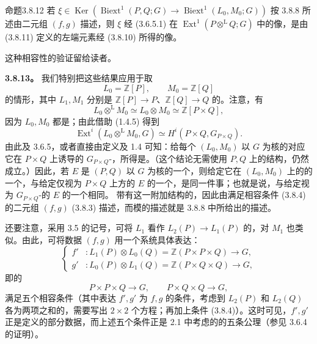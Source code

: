 \begin{SGAresult}{命题}{3.8.12}
若 $\xi\in\operatorname{Ker}(\operatorname{Biext}^1(P,Q;G)\to\operatorname{Biext}^1(L_0,M_0;G))$ 按 3.8.8 所述由二元组 $(f,g)$ 描述，则 $\xi$ 经 (3.6.5.1) 在 $\operatorname{Ext}^1(P\mathbin{\otimes^{\mathrm L}}Q;G)$ 中的像，是由 (3.8.11) 定义的左端元素经 (3.8.10) 所得的像。
\end{SGAresult}
这种相容性的验证留给读者。

\textbf{3.8.13。} 我们特别把这些结果应用于取
\[
L_0=\mathbb Z[P],\qquad M_0=\mathbb Z[Q]
\]
的情形，其中 $L_1,M_1$ 分别是 $\mathbb Z[P]\to P$、$\mathbb Z[Q]\to Q$ 的。注意，有
\[
L_0\mathbin{\otimes^{\mathrm L}}M_0\simeq L_0\otimes M_0\simeq\mathbb Z[P\times Q],
\]
因为 $L_0,M_0$ 都是；由此借助 (1.4.5) 得到
\[
\operatorname{Ext}^i(L_0\mathbin{\otimes^{\mathrm L}}M_0,G)\simeq H^i(P\times Q,G_{P\times Q}).
\]
由此及 3.6.5，或者直接由定义及 1.4 可知：给每个 $(L_0,M_0)$ 以 $G$ 为核的对应它在 $P\times Q$ 上诱导的 $G_{P\times Q}$-，所得是。（这个结论无需使用 $P,Q$ 上的结构，仍然成立。）因此，若 $E$ 是 $(P,Q)$ 以 $G$ 为核的一个，则给定它在 $(L_0,M_0)$ 上的的一个，与给定仅视为 $P\times Q$ 上方的 $E$ 的一个，是同一件事；也就是说，与给定视为 $G_{P\times Q}$-的 $E$ 的一个相同。
带有这一附加结构的，因此由满足相容条件 (3.8.4) 的二元组 $(f,g)$ (3.8.3) 描述，而模的描述就是 3.8.8 中所给出的描述。

还要注意，采用 3.5 的记号，可将 $L_1$ 看作 $L_2(P)\to L_1(P)$ 的，对 $M_1$ 也类似。由此，可将数据 $(f,g)$ 用一个系统具体表达：
\[
\left\{\begin{aligned}
f'&:L_1(P)\otimes L_0(Q)=\mathbb Z(P\times P\times Q)\longrightarrow G,\\
g'&:L_0(P)\otimes L_1(Q)=\mathbb Z(P\times Q\times Q)\longrightarrow G,
\end{aligned}\right.
\]
即的
\[
P\times P\times Q\longrightarrow G,\qquad P\times Q\times Q\longrightarrow G,
\]
满足五个相容条件（其中表达 $f',g'$ 为 $f,g$ 的条件，考虑到 $L_2(P)$ 和 $L_2(Q)$ 各为两项之和的，需要写出 $2\times2$ 个方程；再加上条件 (3.8.4)）。这时可见，$f',g'$ 正是定义的部分数据，而上述五个条件正是 2.1 中考虑的的五条公理（参见 3.6.4 的证明）。

